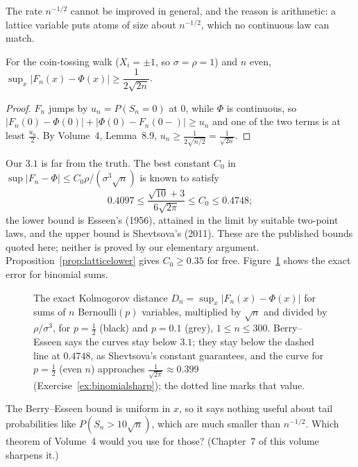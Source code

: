 The rate $n^{-1/2}$ cannot be improved in general, and the reason is arithmetic: a lattice variable puts atoms of size about $n^{-1/2}$, which no
continuous law can match.

\begin{proposition}\label{prop:latticelower}
For the coin-tossing walk ($X_i=\pm1$, so $\sigma=\rho=1$) and $n$ even, $\sup_x|F_n(x)-\Phi(x)|\ge\dfrac1{2\sqrt{2n}}$.
\end{proposition}
\begin{proof}
$F_n$ jumps by $u_n=P(S_n=0)$ at $0$, while $\Phi$ is continuous, so $|F_n(0)-\Phi(0)|+|\Phi(0)-F_n(0-)|\ge u_n$ and one of the two terms is at least
$\frac{u_n}2$. By Volume~4, Lemma~8.9, $u_n\ge\frac1{2\sqrt{n/2}}=\frac1{\sqrt{2n}}$.
\end{proof}

\begin{remark}
Our $3.1$ is far from the truth. The best constant $C_0$ in $\sup|F_n-\Phi|\le C_0\rho/(\sigma^3\sqrt n)$ is known to satisfy
\[
0.4097\le\frac{\sqrt{10}+3}{6\sqrt{2\pi}}\le C_0\le0.4748;
\]
the lower bound is Esseen's (1956), attained in the limit by suitable two-point laws, and the upper bound is Shevtsova's (2011). These are the published bounds quoted here; neither is proved by our elementary argument. Proposition~\ref{prop:latticelower} gives $C_0\ge0.35$ for free. Figure~\ref{fig:berryesseen} shows the exact error for binomial sums.
\end{remark}

\begin{figure}[ht]
\centering{}
\caption{The exact Kolmogorov distance $D_n=\sup_x|F_n(x)-\Phi(x)|$ for sums of $n$ Bernoulli$(p)$ variables, multiplied by $\sqrt n$ and divided by
$\rho/\sigma^3$, for $p=\frac12$ (black) and $p=0.1$ (grey), $1\le n\le300$. Berry--Esseen says the curves stay below $3.1$; they stay below the
dashed line at $0.4748$, as Shevtsova's constant guarantees, and the curve for $p=\frac12$ (even $n$) approaches $\frac1{\sqrt{2\pi}}\approx0.399$ (Exercise~\ref{ex:binomialsharp}); the dotted line marks that value.}
\label{fig:berryesseen}
\end{figure}

\begin{think}
The Berry--Esseen bound is uniform in $x$, so it says nothing useful about tail probabilities like $P(S_n>10\sqrt n)$, which are much smaller than $n^{-1/2}$.
Which theorem of Volume~4 would you use for those? (Chapter~7 of this volume sharpens it.)
\end{think}

